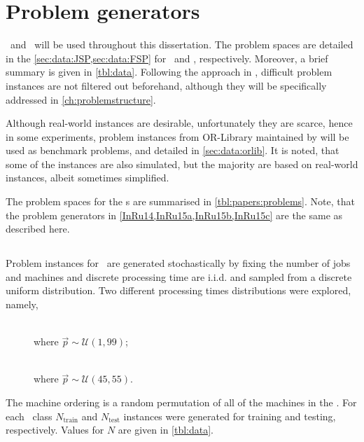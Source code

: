 
\chapter{Problem generators}\label{ch:genprobleminstances} 

 \JSP\ and \FSP\  will be used  throughout this dissertation. The  problem spaces are detailed in the \cref{sec:data:JSP,sec:data:FSP} for \JSP\ and \FSP, respectively. Moreover, a brief summary is given in \cref{tbl:data}.
Following the approach in \citet{Whitley}, difficult problem instances are not filtered out beforehand, although they will be specifically addressed in \cref{ch:problemstructure}. 

Although real-world instances are desirable, unfortunately they are scarce, hence in some experiments, problem instances from OR-Library maintained by \citet{ORlibrary} will be used as benchmark problems, and detailed in \cref{sec:data:orlib}. It is noted, that some of the instances are also simulated, but the majority are based on real-world instances, albeit sometimes simplified. 

The problem spaces for the s are summarised in 
\cref{tbl:papers:problems}. Note, that the problem generators in 
\cref{InRu14,InRu15a,InRu15b,InRu15c} are the same as described here.



\section{\Jsp}\label{sec:data:JSP}
Problem instances for \JSP\ are generated stochastically by fixing the number of jobs and machines and 
discrete processing time are i.i.d. and sampled from a discrete uniform distribution. %
Two different processing times distributions were explored, namely,
\begin{description}
	\item[\Jrnd]  \hfill \\ where $\vec{p}\sim\mathcal{U}(1,99)$;
	\item[\Jrndn]  \hfill \\ where $\vec{p}\sim\mathcal{U}(45,55)$.
\end{description}
The machine ordering is a random permutation of all of the machines in the \jsp. 
For each \JSP\ class $N_{\text{train}}$  and $N_{\text{test}}$ instances were generated for training and testing, respectively. Values for $N$ are given in \cref{tbl:data}. 

